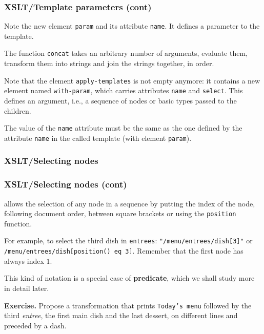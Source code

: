 %
\begin{frame}
\frametitle{XSLT/Template parameters (cont)}

Note the new \XSLT element \texttt{param} and its attribute
\texttt{name}. It defines a parameter to the template.

\bigskip

The function \texttt{concat} takes an arbitrary number of arguments,
evaluate them, transform them into strings and join the strings
together, in order.

\bigskip

Note that the element \texttt{apply-templates} is not empty
anymore: it contains a new \XSLT element named
\texttt{with-param}, which carries attributes
\texttt{name} and \texttt{select}. This defines an argument, i.e., a
sequence of nodes or basic types passed to the children. 

\bigskip

The value of the \texttt{name} attribute must be the same as the one
defined by the attribute \texttt{name} in the called template (with
element \texttt{param}).

\end{frame}

%
\begin{frame}
\frametitle{XSLT/Selecting nodes}
\label{menu}


\end{frame}

%
\begin{frame}[containsverbatim]
\frametitle{XSLT/Selecting nodes (cont)}

\XSLT allows the selection of any node in a sequence by putting the
index of the node, following document order, between square brackets
or using the \texttt{position} function.

\bigskip

For example, to select the third dish in \texttt{entrees}:
\verb|"/menu/entrees/dish[3]"| or
\verb|/menu/entrees/dish[position() eq 3]|. Remember that the first
node has always index \(1\).

\bigskip

This kind of notation is a special case of \textbf{predicate}, which
we shall study more in detail later.

\bigskip

\textbf{Exercise.} Propose a transformation that prints
\texttt{Today's menu} followed by the third \emph{entree}, the first
main dish and the last dessert, on different lines and preceded by a
dash.

\end{frame}

